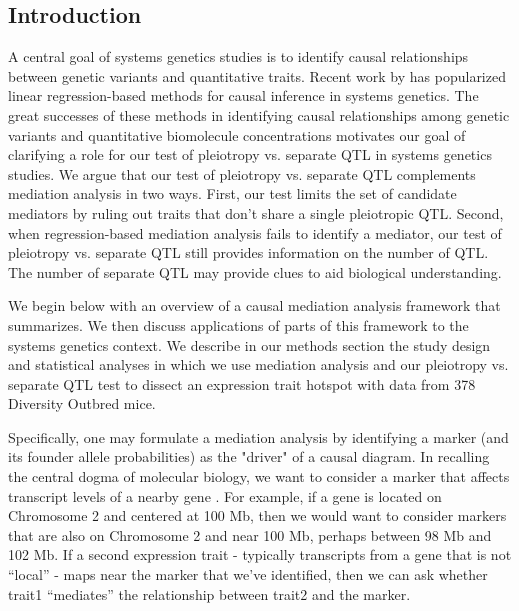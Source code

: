 \documentclass{article}
\begin{document}
\begin{boehm}
\section{Introduction}

A central goal of systems genetics studies is to identify causal relationships between genetic variants and quantitative traits. Recent work by \citet{chick2016defining} has popularized linear regression-based methods for causal inference in systems genetics. The great successes of these methods in identifying causal relationships among genetic variants and quantitative biomolecule concentrations motivates our goal of clarifying a role for our test of pleiotropy vs. separate QTL in systems genetics studies. We argue that our test of pleiotropy vs. separate QTL complements mediation analysis in two ways. First, our test limits the set of candidate mediators by ruling out traits that don't share a single pleiotropic QTL. Second, when regression-based mediation analysis fails to identify a mediator, our test of pleiotropy vs. separate QTL still provides information on the number of QTL. The number of separate QTL may provide clues to aid biological understanding.

We begin below with an overview of a causal mediation analysis framework that \citet{vanderweele2015explanation} summarizes. We then discuss applications of parts of this framework to the systems genetics context. We describe in our methods section the study design and statistical analyses in which we use mediation analysis and our pleiotropy vs. separate QTL test to dissect an expression trait hotspot with data from 378 Diversity Outbred mice.






Specifically, one may formulate a mediation analysis by identifying a marker (and its founder allele probabilities) as the "driver" of a causal diagram. In recalling the central dogma of molecular biology, we want to consider a marker that affects transcript levels of a nearby gene \citep{crick1958protein}. For example, if a gene is located on Chromosome 2 and centered at 100 Mb, then we would want to consider markers that are also on Chromosome 2 and near 100 Mb, perhaps between 98 Mb and 102 Mb. If a second expression trait - typically transcripts from a gene that is not “local” - maps near the marker that we’ve identified, then we can ask whether trait1 “mediates” the relationship between trait2 and the marker.


\end{boehm}
\end{document}
